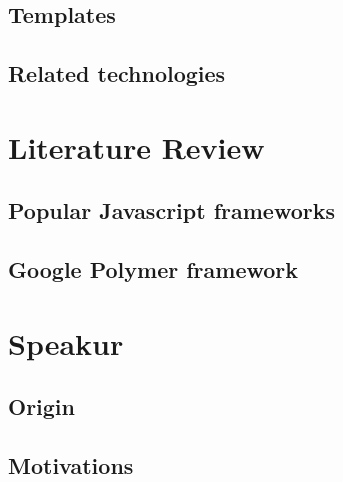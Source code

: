 \subsection{Templates}
\subsection{Related technologies}

\section{Literature Review}
\subsection{Popular Javascript frameworks}
\subsection{Google Polymer framework}

\section{Speakur}
\subsection{Origin}
\subsection{Motivations}

